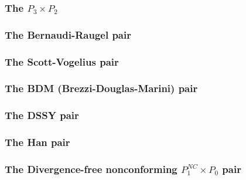\subsubsection{The $P_3\times P_2$} \label{ss:p3p2}


\subsubsection{The Bernaudi-Raugel pair} \label{ss:bernaudi_raugel}


\subsubsection{The Scott-Vogelius pair} \label{ss:scott_vogelius}


\subsubsection{The BDM (Brezzi-Douglas-Marini) pair} \label{ss:bdm}


\subsubsection{The DSSY pair} \label{ss:pair_dssy2D}


\subsubsection{The Han pair} \label{ss:han}



\subsubsection{The Divergence-free nonconforming $P_1^{NC}\times P_0$ pair} \label{ss:p1ncp0}



